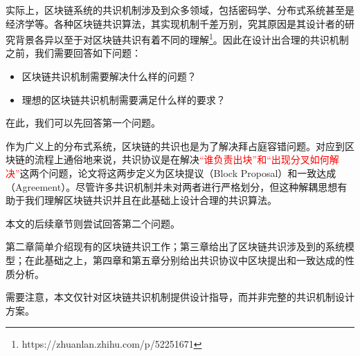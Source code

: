 

实际上，区块链系统的共识机制涉及到众多领域，包括密码学、分布式系统甚至是经济学等。各种区块链共识算法，其实现机制千差万别，究其原因是其设计者的研究背景各异以至于对区块链共识有着不同的理解\footnote{https://zhuanlan.zhihu.com/p/52251671}。因此在设计出合理的共识机制之前，我们需要回答如下问题：

\begin{itemize}
	\item 区块链共识机制需要解决什么样的问题？
	\item 理想的区块链共识机制需要满足什么样的要求？
\end{itemize}

在此，我们可以先回答第一个问题。

 作为广义上的分布式系统，区块链的共识也是为了解决拜占庭容错问题。对应到区块链的流程上通俗地来说，共识协议是在解决\textcolor{red}{“谁负责出块”和“出现分叉如何解决”}这两个问题\cite{ultrain2019}，论文\cite{gilad2017algorand}将这两步定义为区块提议（Block Proposal）和一致达成（Agreement）。尽管许多共识机制并未对两者进行严格划分，但这种解耦思想有助于我们理解区块链共识并且在此基础上设计合理的共识算法\cite{kogias2016enhancing,eyal2016bitcoin}。

本文的后续章节则尝试回答第二个问题。

第二章简单介绍现有的区块链共识工作；第三章给出了区块链共识涉及到的系统模型；在此基础之上，第四章和第五章分别给出共识协议中区块提出和一致达成的性质分析。

需要注意，本文仅针对区块链共识机制提供设计指导，而并非完整的共识机制设计方案。



